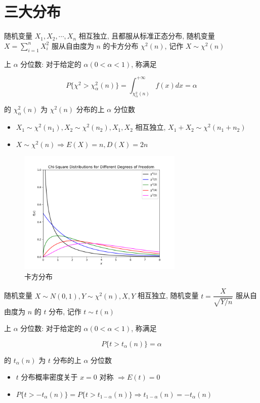 \section{三大分布}
\begin{definition}[$\chi^{2}$ 分布]

	随机变量 $X_{1},X_{2},\cdots,X_{n}$ 相互独立, 且都服从标准正态分布, 随机变量 $X = \sum\limits_{i = 1}^{n}X_{i}^2$ 
	服从自由度为 $n$ 的卡方分布 $\chi^2(n)$, 记作 $X\sim \chi^2(n)$
	
	上 $\alpha$ 分位数: 对于给定的 $\alpha (0 < \alpha < 1)$, 称满足

	$$P\{\chi^{2} > \chi_{\alpha}^{2}(n)\} = \int_{\chi_{\alpha}^{2}(n)}^{+\infty}f(x)dx = \alpha$$
	
	的 $\chi_{\alpha}^{2}(n)$ 为 $\chi^2(n)$ 分布的上 $\alpha$ 分位数
	\begin{itemize}
		\item $X_{1}\sim \chi^{2}(n_{1}), X_{2}\sim \chi^{2}(n_{2}), X_{1},X_{2}$ 相互独立, $X_{1} + X_{2}\sim \chi^{2}(n_{1}+n_{2})$
		\item $X\sim \chi^2(n)\Rightarrow E(X) = n, D(X) = 2n$
	\end{itemize}
\end{definition}
\begin{figure}[H]
	\centering  %
	\includegraphics[width=0.7\textwidth]{"figure/Note/卡方分布.png"}
	\caption{卡方分布}
	\label{fig:卡方分布}
\end{figure}
\begin{definition}[$t$ 分布]

	随机变量 $X\sim N(0,1), Y\sim \chi^{2}(n), X, Y$ 相互独立, 随机变量 $t = \dfrac{X}{\sqrt{Y/n}}$ 服从自由度为 $n$ 的 $t$ 分布, 记作 $t\sim t(n)$
	
	上 $\alpha$ 分位数: 对于给定的 $\alpha (0 < \alpha < 1)$, 称满足

	$$P\{t > t_{\alpha}(n)\} = \alpha$$
	
	的 $t_{\alpha}(n)$ 为 $t$ 分布的上 $\alpha$ 分位数
	\begin{itemize}
		\item $t$ 分布概率密度关于 $x = 0$ 对称 $\Rightarrow E(t) = 0$
		\item $P\{t > - t_{\alpha}(n)\} = P\{t > t_{1-\alpha}(n)\} \Rightarrow t_{1-\alpha}(n) = -t_{\alpha}(n)$
	\end{itemize}
\end{definition}

